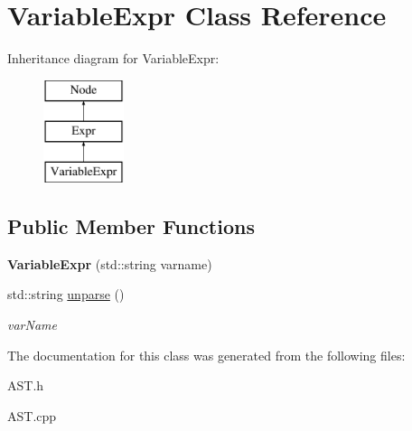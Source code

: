 \hypertarget{classVariableExpr}{\section{Variable\-Expr Class Reference}
\label{classVariableExpr}
}
Inheritance diagram for Variable\-Expr\-:\begin{figure}[H]
\begin{center}
\leavevmode
\includegraphics[height=3.000000cm]{classVariableExpr}
\end{center}
\end{figure}
\subsection*{Public Member Functions}
\begin{DoxyCompactItemize}
\item 
\hypertarget{classVariableExpr_a4721ca79bc7096ae785447fca5d5c71a}{{\bfseries Variable\-Expr} (std\-::string varname)}\label{classVariableExpr_a4721ca79bc7096ae785447fca5d5c71a}

\item 
\hypertarget{classVariableExpr_a2e00f9beec24b519646b0c6259fcf0d4}{std\-::string \hyperlink{classVariableExpr_a2e00f9beec24b519646b0c6259fcf0d4}{unparse} ()}\label{classVariableExpr_a2e00f9beec24b519646b0c6259fcf0d4}

\begin{DoxyCompactList}\small\item\em var\-Name \end{DoxyCompactList}\end{DoxyCompactItemize}


The documentation for this class was generated from the following files\-:\begin{DoxyCompactItemize}
\item 
A\-S\-T.\-h\item 
A\-S\-T.\-cpp\end{DoxyCompactItemize}

